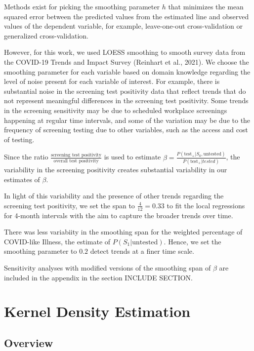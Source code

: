 \documentclass[12pt,twoside]{smiththesis}
\begin{document}
Methods exist for picking the smoothing parameter \(h\) that minimizes the mean squared error between the predicted values from the estimated line and observed values of the dependent variable, for example, leave-one-out cross-validation or generalized cross-validation.

However, for this work, we used LOESS smoothing to smooth survey data from the COVID-19 Trends and Impact Survey (Reinhart et al., 2021).
We choose the smoothing parameter for each variable based on domain knowledge regarding the level of noise present for each variable of interest. For example, there is substantial noise in the screening test positivity data that reflect trends that do not represent meaningful differences in the screening test positivity. Some trends in the screening sensitivity may be due to scheduled workplace screenings happening at regular time intervals, and some of the variation may be due to the frequency of screening testing due to other variables, such as the access and cost of testing.

Since the ratio \(\frac{\text{screening test positivity}}{\text{overall test positivity}}\) is used to estimate \(\beta = \frac{P(\text{test}_+| S_0, \text{untested})}{P(\text{test}_+|tested)}\), the variability in the screening positivity creates substantial variability in our estimates of \(\beta\).

In light of this variability and the presence of other trends regarding the screening test positivity, we set the span to \(\frac{4}{12} = 0.33\) to fit the local regressions for 4-month intervals with the aim to capture the broader trends over time.

There was less variabiity in the smoothing span for the weighted percentage of COVID-like Illness, the estimate of \(P(S_1|\text{untested})\). Hence, we set the smoothing parameter to \(0.2\) detect trends at a finer time scale.

Sensitivity analyses with modified versions of the smoothing span of \(\beta\) are included in the appendix in the section INCLUDE SECTION.

\newpage

\hypertarget{kernel-density-estimation}{%
\section{Kernel Density Estimation}\label{kernel-density-estimation}}

\hypertarget{overview-1}{%
\subsection{Overview}\label{overview-1}}
\end{document}
